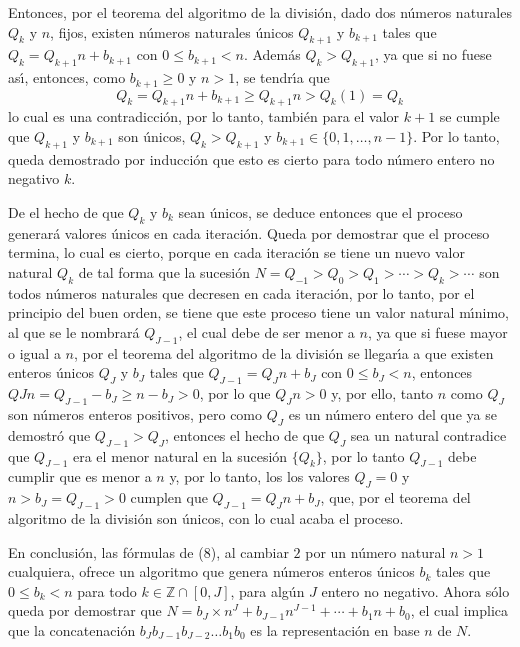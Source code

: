 \begin{solucion}
 Entonces, por el teorema del algoritmo de la divisi\'on, dado dos n\'umeros naturales $Q_k$ y $n$, fijos, existen n\'umeros naturales \'unicos $Q_{k+1}$ y $b_{k+1}$ tales que $Q_k = Q_{k+1}n + b_{k+1}$ con $0\leq b_{k+1} < n$. Adem\'as $Q_{k} > Q_{k+1}$, ya que si no fuese as\'{\i}, entonces, como $b_{k+1} \geq 0$ y $n > 1$, se tendr\'{\i}a que
 \begin{equation*}
  Q_{k} = Q_{k+1}n + b_{k+1} \geq Q_{k+1}n > Q_{k}(1) = Q_{k}
 \end{equation*}
 lo cual es una contradicci\'on, por lo tanto, tambi\'en para el valor $k+1$ se cumple que $Q_{k+1}$ y $b_{k+1}$ son \'unicos, $Q_{k} > Q_{k+1}$ y $b_{k+1} \in \{ 0, 1, \ldots , n-1 \}$. Por lo tanto, queda demostrado por inducci\'on que esto es cierto para todo n\'umero entero no negativo $k$.
 \par 
 De el hecho de que $Q_k$ y $b_k$ sean \'unicos, se deduce entonces que el proceso generar\'a valores \'unicos en cada iteraci\'on. Queda por demostrar que el proceso termina, lo cual es cierto, porque en cada iteraci\'on se tiene un nuevo valor natural $Q_{k}$ de tal forma que la sucesi\'on $N = Q_{-1} > Q_{0} > Q_{1} > \cdots > Q_{k} > \cdots$ son todos n\'umeros naturales que decresen en cada iteraci\'on, por lo tanto, por el principio del buen orden, se tiene que este proceso tiene un valor natural m\'{\i}nimo, al que se le nombrar\'a $Q_{J-1}$, el cual debe de ser menor a $n$, ya que si fuese mayor o igual a $n$, por el teorema del algoritmo de la divisi\'on se llegar\'{\i}a a que existen enteros \'unicos $Q_J$ y $b_J$ tales que $Q_{J-1} = Q_J n + b_J$ con $0 \leq b_J < n$, entonces $QJn = Q_{J-1} - b_J \geq n - b_J > 0$, por lo que $Q_Jn > 0$ y, por ello, tanto $n$ como $Q_J$ son n\'umeros enteros positivos, pero como $Q_J$ es un n\'umero entero del que ya se demostr\'o que $Q_{J-1} > Q_J$, entonces el hecho de que $Q_J$ sea un natural contradice que $Q_{J-1}$ era el menor natural en la sucesi\'on $\{Q_{k}\}$, por lo tanto $Q_{J-1}$ debe cumplir que es menor a $n$ y, por lo tanto, los los valores $Q_J = 0$ y $n > b_J = Q_{J-1} > 0$ cumplen que $Q_{J-1} = Q_J n + b_J$, que, por el teorema del algoritmo de la divisi\'on son \'unicos, con lo cual acaba el proceso.
 \par 
 En conclusi\'on, las f\'ormulas de (8), al cambiar $2$ por un n\'umero natural $n > 1$ cualquiera, ofrece un algoritmo que genera n\'umeros enteros \'unicos $b_k$ tales que $0 \leq b_k < n$ para todo $k \in \mathbb{Z}\cap[0,J]$, para alg\'un $J$ entero no negativo. Ahora s\'olo queda por demostrar que $N = b_{J} \times n^{J} + b_{J-1}n^{J-1} + \cdots + b_1n + b_0$, el cual implica que la concatenaci\'on $b_J b_{J-1} b_{J-2} \ldots b_1 b_0$ es la representaci\'on en base $n$ de $N$.

\end{solucion}
